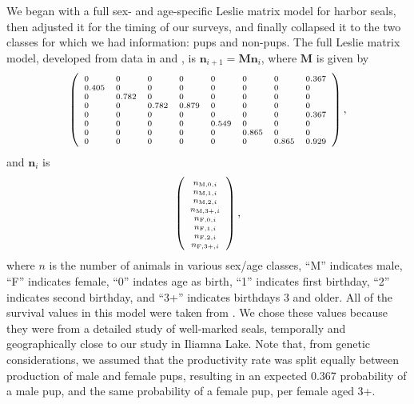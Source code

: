 \documentclass[12pt, titlepage]{article}\usepackage[]{graphicx}\usepackage[]{color}
\newcommand{\bn}{\ensuremath{{\boldsymbol{\eta}}}}
\def\bn{\mathbf{n}}
\def\bM{\mathbf{M}}
\begin{document}
We began with a full sex- and age-specific Leslie matrix model for harbor seals, then adjusted it for the timing of our surveys, and finally collapsed it to the two classes for which we had information: pups and non-pups.  The full Leslie matrix model, developed from data in \citet{Hast:Smal:Pend:sex:2012} and \citet{Pitc:Calk:biol:1979}, is $\bn_{i+1} = \bM \bn_i$, where $\bM$ is given by
\begin{equation} \label{eq:LesMFull1}
  \left( \mbox{\scriptsize$\begin{array}{llllllll}
 0 & 0 & 0 & 0 & 0 & 0 & 0 & 0.367 \\ 
  0.405 & 0 & 0 & 0 & 0 & 0 & 0 & 0 \\ 
  0 & 0.782 & 0 & 0 & 0 & 0 & 0 & 0 \\ 
  0 & 0 & 0.782 & 0.879 & 0 & 0 & 0 & 0 \\ 
  0 & 0 & 0 & 0 & 0 & 0 & 0 & 0.367 \\ 
  0 & 0 & 0 & 0 & 0.549 & 0 & 0 & 0 \\ 
  0 & 0 & 0 & 0 & 0 & 0.865 & 0 & 0 \\ 
  0 & 0 & 0 & 0 & 0 & 0 & 0.865 & 0.929 \\ 
  
  \end{array} $} \right),
\end{equation}
and $\bn_i$ is
\begin{equation} \label{eq:n1}
  \left(\mbox{\scriptsize$\begin{array}{c}
    n_{\textrm{M,0},i} \\
    n_{\textrm{M,1},i} \\
    n_{\textrm{M,2},i} \\
    n_{\textrm{M,3+},i} \\
    n_{\textrm{F,0},i} \\
    n_{\textrm{F,1},i} \\
    n_{\textrm{F,2},i} \\
    n_{\textrm{F,3+},i} \\
  \end{array} $} \right),
\end{equation}
where $n$ is the number of animals in various sex/age classes, ``M'' indicates male, ``F'' indicates female, ``0'' indates age as birth, ``1'' indicates first birthday, ``2'' indicates second birthday, and ``3+'' indicates birthdays 3 and older. All of the survival values in this model were taken from \citet[][Table 2, part a]{Hast:Smal:Pend:sex:2012}.  We chose these values because they were from a detailed study of well-marked seals, temporally and geographically close to our study in Iliamna Lake. Note that, from genetic considerations, we assumed that the productivity rate was split equally between production of male and female pups, resulting in an expected 0.367 probability of a male pup, and the same probability of a female pup, per female aged 3+.
\end{document}
